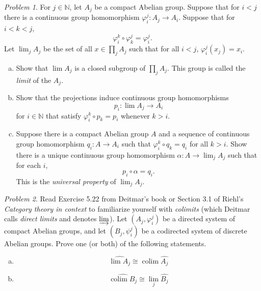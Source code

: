 \documentclass[11pt,twoside]{amsart}
\theoremstyle{plain}
\theoremstyle{remark}
\newtheorem{prob}{Problem}
\theoremstyle{definition}
\theoremstyle{definition}
\newcommand{\NN}{\mathbb{N}}
\newcommand{\colim}{\operatorname{colim}}
\begin{document}
\begin{prob}
For $j\in \NN$, let $A_j$ be a compact Abelian group. Suppose that for $i<j$ there is a continuous group homomorphism $\varphi_i^j\colon A_j\to A_i$. Suppose that for $i<k<j$,
\[
  \varphi_i^k\circ \varphi_k^j = \varphi_i^j.
\]
Let $\lim_j A_j$ be the set of all $x\in \prod_j A_j$ such that for all $i<j$, $\varphi_i^j(x_j)=x_i$.
\begin{enumerate}[(a)]
\item Show that $\lim A_j$ is a closed subgroup of $\prod_j A_j$. This group is called the \emph{limit} of the $A_j$.
\item Show that the projections induce continuous group homomorphisms
\[
  p_i\colon \lim A_j\longrightarrow A_i
\]
for $i\in \NN$ that satisfy $\varphi_i^k\circ p_k = p_i$ whenever $k>i$.
\item Suppose there is a compact Abelian group $A$ and a sequence of continuous group homomorphism $q_i\colon A\to A_i$ such that $\varphi_i^k\circ q_k=q_i$ for all $k>i$. Show there is a unique continuous group homomorphism $\alpha\colon A\to \lim_j A_j$ such that for each $i$,
\[
  p_i\circ \alpha = q_i.
\]
This is the \emph{universal property} of $\lim_j A_j$.
\end{enumerate}
\end{prob}

\begin{prob}
Read Exercise 5.22 from Deitmar's book or Section 3.1 of Riehl's \emph{Category theory in context} to familiarize yourself with \emph{colimits} (which Deitmar calls \emph{direct limits} and denotes $\varinjlim$). Let $(A_j,\varphi_i^j)$ be a directed system of compact Abelian groups, and let $(B_j,\psi_i^j)$ be a codirected system of discrete Abelian groups. Prove one (or both) of the following statements.
\begin{enumerate}[(a)]
\item
\[
  \widehat{\lim A_j} \cong \colim \widehat{A_j}
\]
\item
\[
  \widehat{\colim B_j}\cong \lim_j \widehat{B_j}
\]
\end{enumerate}
\end{prob}
\end{document}
